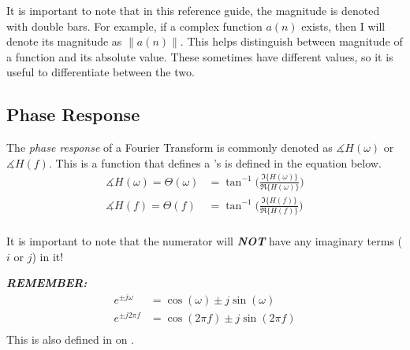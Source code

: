 \begin{remark*}
  It is important to note that in this reference guide, the magnitude is denoted with double bars.
  For example, if a complex function $a(n)$ exists, then I will denote its magnitude as $\lVert a(n) \rVert$.
  This helps distinguish between magnitude of a function and its absolute value.
  These sometimes have different values, so it is useful to differentiate between the two.
\end{remark*}

\subsection{Phase Response}\label{subsec:Fourier_Phase_Response}
\begin{definition}\label{def:Fourier_Phase_Response}
  The \emph{phase response} of a Fourier Transform is commonly denoted as $\measuredangle H(\omega)$ or $\measuredangle H(f)$.
  This is a function that defines a 's  is defined in the equation below.
  \begin{equation}\label{eq:Fourier_Phase_Response}
    \begin{aligned}
      \measuredangle H(\omega) = \Theta (\omega) &= \tan^{-1} \Biggl( \frac{\Im \lbrace H(\omega) \rbrace}{\Re \lbrace H(\omega) \rbrace} \Biggr) \\
      \measuredangle H(f) = \Theta (f) &= \tan^{-1} \Biggl( \frac{\Im \lbrace H(f) \rbrace}{\Re \lbrace H(f) \rbrace} \Biggr) \\
    \end{aligned}
  \end{equation}

  \begin{remark}
    It is important to note that the numerator will \textbf{\emph{NOT}} have any imaginary terms ($i$ or $j$) in it!
  \end{remark}

  \begin{remark}\label{rmk:Complex_Exp-Unit_Circle_Relation}
    \textbf{\emph{REMEMBER:}}
    \begin{equation}\label{eq:Complex_Exp-Unit_Circle_Relation}
      \begin{aligned}
        e^{\pm j\omega} &= \cos (\omega) \pm j \sin (\omega) \\
        e^{\pm j 2 \pi f} &= \cos (2 \pi f) \pm j \sin (2 \pi f) \\
      \end{aligned}
    \end{equation}
    This is also defined in  on .
  \end{remark}
\end{definition}
